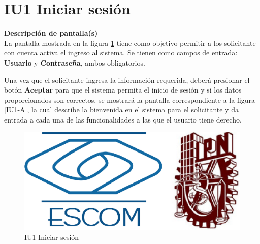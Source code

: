 
\pagebreak
\hypertarget{IU1}{}
\section{IU1 Iniciar sesión}

	\noindent \textbf{Descripción de pantalla(s)}\\

		La pantalla mostrada en la figura \ref{IU1} tiene como objetivo permitir a los solicitante con cuenta activa el ingreso al sistema. Se tienen como campos de entrada: \textbf{Usuario} y \textbf{Contraseña}, ambos obligatorios. 
		
		Una vez que el solicitante ingresa la información requerida, deberá presionar el botón \textbf{Aceptar} para que el sistema permita el inicio de sesión y si los datos proporcionados son correctos, se mostrará la pantalla correspondiente a la figura \ref{IU1-A}, la cual describe la bienvenida en el sistema para el solicitante y da entrada a cada una de las funcionalidades a las que el usuario tiene derecho.

		\begin{figure}[h]

			\begin{center}				

				\includegraphics[scale=0.35]{./imagenes/IUs/RegistroSolicitantes/iu1-IniciarSesion/IU1-IniciarSesion.jpg}
				\caption{IU1 Iniciar sesión}
				\label{IU1}

			\end{center}
				
		\end{figure}

